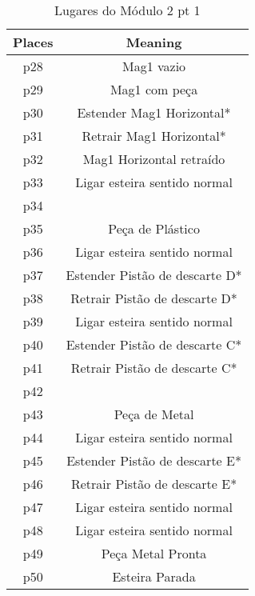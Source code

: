 \begin{table}[htbp]
\caption{Lugares do Módulo 2 pt 1}
\centering
\begin{tabular}{c|c}
Places & Meaning\\
\hline
p28 & Mag1 vazio\\
p29 & Mag1 com peça\\
p30 & Estender Mag1 Horizontal*\\
p31 & Retrair Mag1 Horizontal*\\
p32 & Mag1 Horizontal retraído\\
p33 & Ligar esteira sentido normal\\
p34 & \\
p35 & Peça de Plástico\\
p36 & Ligar esteira sentido normal\\
p37 & Estender Pistão de descarte D*\\
p38 & Retrair Pistão de descarte D*\\
p39 & Ligar esteira sentido normal\\
p40 & Estender Pistão de descarte C*\\
p41 & Retrair Pistão de descarte C*\\
p42 & \\
p43 & Peça de Metal\\
p44 & Ligar esteira sentido normal\\
p45 & Estender Pistão de descarte E*\\
p46 & Retrair Pistão de descarte E*\\
p47 & Ligar esteira sentido normal\\
p48 & Ligar esteira sentido normal\\
p49 & Peça Metal Pronta\\
p50 & Esteira Parada\\
\end{tabular}
\end{table}

